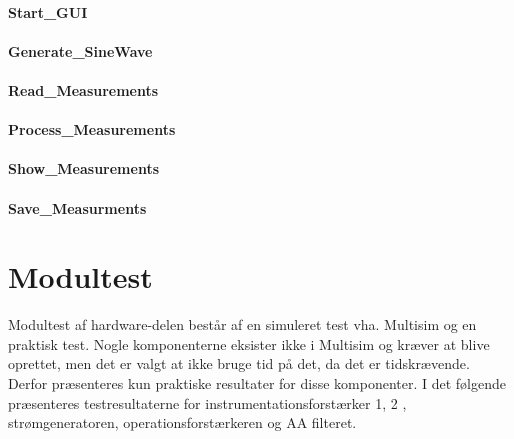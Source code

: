 \subsubsection{Start\_GUI} 




\subsubsection{Generate\_SineWave} 





\subsubsection{Read\_Measurements}


\subsubsection{Process\_Measurements} 





\subsubsection{Show\_Measurements} 


\subsubsection{Save\_Measurments} 




\chapter{Modultest}
Modultest af hardware-delen består af en simuleret test vha. Multisim og en praktisk test. Nogle komponenterne eksister ikke i Multisim og kræver at blive oprettet, men det er valgt at ikke bruge tid på det, da det er tidskrævende. Derfor præsenteres kun praktiske resultater for disse komponenter. I det følgende præsenteres testresultaterne for instrumentationsforstærker 1, 2 , strømgeneratoren, operationsforstærkeren og AA filteret. 


